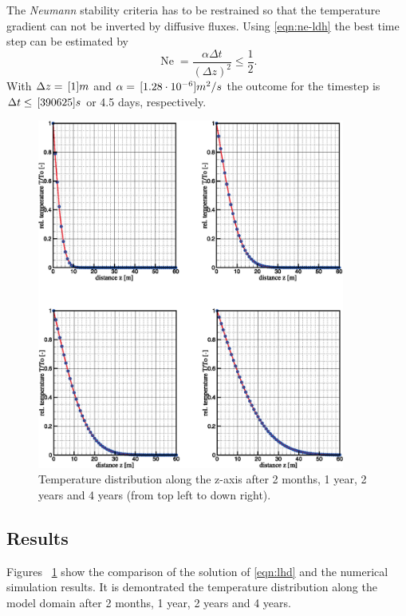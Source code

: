 The \textit{Neumann} stability criteria has to be restrained so that the temperature gradient can not be inverted by diffusive fluxes. Using \eqref{eqn:ne-ldh} the best time step can be estimated by
%
\begin{equation}
\operatorname{Ne} = \frac{\alpha\Delta t}{(\Delta z)^2}\leq\frac{1}{2}.
\label{eqn:ne-ldh}
\end{equation}
%
With $\Delta z=\, \mathrm{[}1]{m}$ and $\alpha=\, \mathrm{[}1.28 \cdot 10^{-6}]{m^2/s}$ the outcome for the timestep is $\Delta t\leq \, \mathrm{[}390625]{s}$ or 4.5 days, respectively.

\begin{figure}[htb!]%
\centering
\includegraphics[width=0.9\textwidth]{PART_II/T/lhd-all.eps}
\caption{\label{fig-lhd-all}Temperature distribution along the z-axis after 2 months, 1 year, 2 years and 4 years (from top left to down right).}
\end{figure}

\subsection{Results}

Figures ~\ref{fig-lhd-all} show the comparison of the solution of \eqref{eqn:lhd} and the numerical simulation results. It is demontrated the temperature distribution along the model domain after 2 months, 1 year, 2 years and 4 years.

